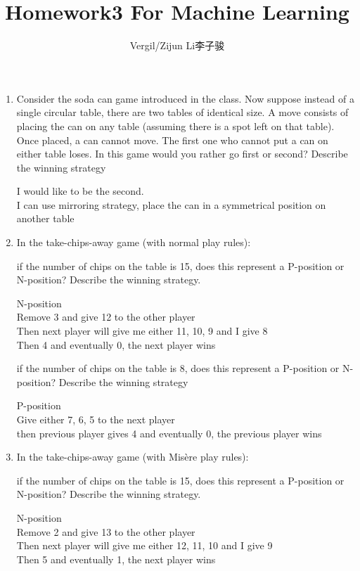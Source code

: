 \documentclass[a4paper]{article}
\author{Vergil/Zijun Li李子骏}
\title{Homework3 For Machine Learning}
\date{\vspace{-5ex}}
\begin{document}
\maketitle

\bf\begin{enumerate}

    \item Consider the soda can game introduced in the class. Now suppose instead of a single circular table, there are two tables of identical size. A move consists of placing the can on any table (assuming there is a spot left on that table). Once placed, a can cannot move. The first one who cannot put a can on either table loses. In this game would you rather go first or second? Describe the winning strategy

    {\normalfont I would like to be the second.\\
    I can use mirroring strategy, place the can in a symmetrical position on another table }

    \item  In the take-chips-away game (with normal play rules):

    \subitem if the number of chips on the table is 15, does this represent a P-position or N-position? Describe the winning strategy.
    
    {\normalfont N-position\\
    Remove 3 and give 12 to the other player\\
    Then next player will give me either 11, 10, 9 and I give 8\\
    Then 4 and eventually 0, the next player wins}

    \subitem if the number of chips on the table is 8, does this represent a P-position or N-position? Describe the winning strategy

    {\normalfont P-position\\
    Give either 7, 6, 5 to the next player\\
    then previous player gives 4 and eventually 0, the previous player wins }

    \item  In the take-chips-away game (with Misère play rules):

    \subitem if the number of chips on the table is 15, does this represent a P-position or N-position? Describe the winning strategy.

    {\normalfont N-position\\
    Remove 2 and give 13 to the other player\\
    Then next player will give me either 12, 11, 10 and I give 9\\
    Then 5 and eventually 1, the next player wins}


\end{enumerate}
\end{document}
